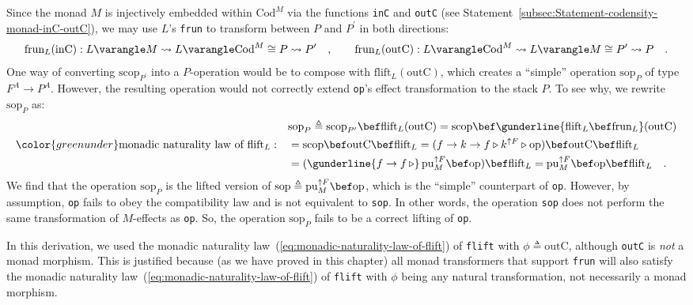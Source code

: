 Since the monad $M$ is injectively embedded within $\text{Cod}^{M}$
via the functions \lstinline!inC! and \lstinline!outC! (see Statement~\ref{subsec:Statement-codensity-monad-inC-outC}),
we may use $L$\textsf{'}s \lstinline!frun! to transform between $P$ and
$P^{\prime}$ in both directions:
\[
\text{frun}_{L}(\text{inC}):L\varangle M\leadsto L\varangle\text{Cod}^{M}\cong P\leadsto P^{\prime}\quad,\quad\quad\text{frun}_{L}(\text{outC}):L\varangle\text{Cod}^{M}\leadsto L\varangle M\cong P^{\prime}\leadsto P\quad.
\]
One way of converting $\text{scop}_{P^{\prime}}$ into a $P$-operation
would be to compose with $\text{flift}_{L}(\text{outC})$, which creates
a \textsf{``}simple\textsf{''} operation $\text{sop}_{P}$ of type $F^{A}\rightarrow P^{A}$.
However, the resulting operation would not correctly extend \lstinline!op!\textsf{'}s
effect transformation to the stack $P$. To see why, we rewrite $\text{sop}_{P}$
as:
\begin{align*}
 & \text{sop}_{P}\triangleq\text{scop}_{P^{\prime}}\bef\text{flift}_{L}(\text{outC})=\text{scop}\bef\gunderline{\text{flift}_{L}\bef\text{frun}_{L}}(\text{outC})\\
{\color{greenunder}\text{monadic naturality law of }\text{flift}_{L}:}\quad & =\text{scop}\bef\text{outC}\bef\text{flift}_{L}=(f\rightarrow k\rightarrow f\triangleright k^{\uparrow F}\triangleright\text{op})\bef\text{outC}\bef\text{flift}_{L}\\
 & =(\gunderline{f\rightarrow f\,\triangleright}\,\text{pu}_{M}^{\uparrow F}\bef\text{op})\bef\text{flift}_{L}=\text{pu}_{M}^{\uparrow F}\bef\text{op}\bef\text{flift}_{L}\quad.
\end{align*}
We find that the operation $\text{sop}_{P}$ is the lifted version
of $\text{sop}\triangleq\text{pu}_{M}^{\uparrow F}\bef\text{op}$,
which is the \textsf{``}simple\textsf{''} counterpart of \lstinline!op!. However,
by assumption, \lstinline!op! fails to obey the compatibility law
and is not equivalent to \lstinline!sop!. In other words, the operation
\lstinline!sop! does not perform the same transformation of $M$-effects
as \lstinline!op!. So, the operation $\text{sop}_{P}$ fails to be
a correct lifting of \lstinline!op!.

In this derivation, we used the monadic naturality law~(\ref{eq:monadic-naturality-law-of-flift})
of \lstinline!flift! with $\phi\triangleq\text{outC}$, although
\lstinline!outC! is \emph{not} a monad morphism. This is justified
because (as we have proved in this chapter) all monad transformers
that support \lstinline!frun! will also satisfy the monadic naturality
law~(\ref{eq:monadic-naturality-law-of-flift}) of \lstinline!flift!
with $\phi$ being any natural transformation, not necessarily a monad
morphism. 


